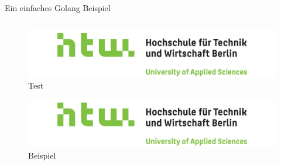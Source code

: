 \begin{listing}
    \label{lst:Golang}
    \caption{Ein einfaches Golang Beispiel}
    \inputminted{go}{snippets/examples/hello.go}
\end{listing}

\newpage

\begin{figure}
    \label{figure:test}
    \includegraphics[scale=0.2]{img/HTW}
    \caption{Test}
\end{figure}

\begin{figure}
    \label{figure:beispiel}
    \includegraphics[scale=0.2]{img/HTW}
    \caption{Beispiel}
\end{figure}
